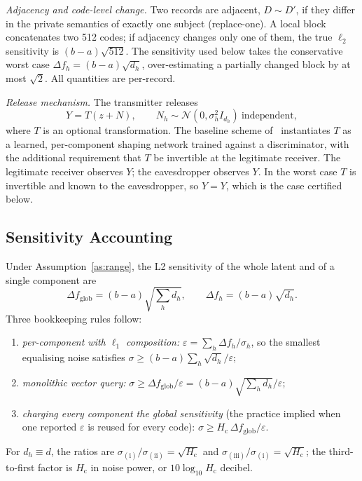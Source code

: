 \emph{Adjacency and code-level change.} Two records are adjacent, $D\sim D'$,
if they differ in the private semantics of exactly one subject (replace-one).
A local block concatenates two 512 codes; if adjacency changes only one of
them, the true $\ell_2$ sensitivity is $(b-a)\sqrt{512}$. The sensitivity
used below takes the conservative worst case $\Delta f_h=(b-a)\sqrt{d_h}$,
over-estimating a partially changed block by at most $\sqrt{2}$. All
quantities are per-record.

\emph{Release mechanism.} The transmitter releases
\begin{equation}
Y=T\!\left(z+N\right),\qquad
N_h\sim\mathcal{N}\!\left(0,\sigma_h^{2} I_{d_h}\right)\ \text{independent},
\label{eq:mechanism}
\end{equation}
where $T$ is an optional transformation. The baseline scheme
of~\cite{arXiv2510} instantiates $T$ as a learned, per-component shaping
network trained against a discriminator, with the additional requirement that
$T$ be invertible at the legitimate receiver. The legitimate receiver observes
$Y$; the eavesdropper observes $Y$. In the worst case $T$ is invertible and
known to the eavesdropper, so $Y=Y$, which is the case certified below.

\subsection{Sensitivity Accounting}
\label{sec:sensitivity}

\begin{proposition}
\label{pr:inflation}
Under Assumption~\ref{as:range}, the L2 sensitivity of the whole latent and of
a single component are
\begin{equation}
\Delta f_{\mathrm{glob}}=(b-a)\sqrt{{\textstyle\sum_h d_h}},
\qquad
\Delta f_h=(b-a)\sqrt{d_h}.
\label{eq:sens}
\end{equation}
Three bookkeeping rules follow:
\begin{enumerate}
\item[(i)] \emph{per-component with $\ell_1$ composition:}
$\varepsilon=\sum_{h}\Delta f_h/\sigma_h$, so the smallest equalising noise
satisfies $\sigma\ge(b-a)\textstyle\sum_h\sqrt{d_h}/\varepsilon$;
\item[(ii)] \emph{monolithic vector query:}
$\sigma\ge\Delta f_{\mathrm{glob}}/\varepsilon
=(b-a)\sqrt{{\textstyle\sum_h d_h}}/\varepsilon$;
\item[(iii)] \emph{charging every component the global sensitivity} (the
practice implied when one reported $\varepsilon$ is reused for every code):
$\sigma\ge H_{\mathrm c}\,\Delta f_{\mathrm{glob}}/\varepsilon$.
\end{enumerate}
For $d_h\equiv d$, the ratios are
$\sigma_{\mathrm{(i)}}/\sigma_{\mathrm{(ii)}}=\sqrt{H_{\mathrm c}}$ and
$\sigma_{\mathrm{(iii)}}/\sigma_{\mathrm{(i)}}=\sqrt{H_{\mathrm c}}$; the
third-to-first factor is $H_{\mathrm c}$ in noise power, or
$10\log_{10}H_{\mathrm c}$ decibel.
\end{proposition}

